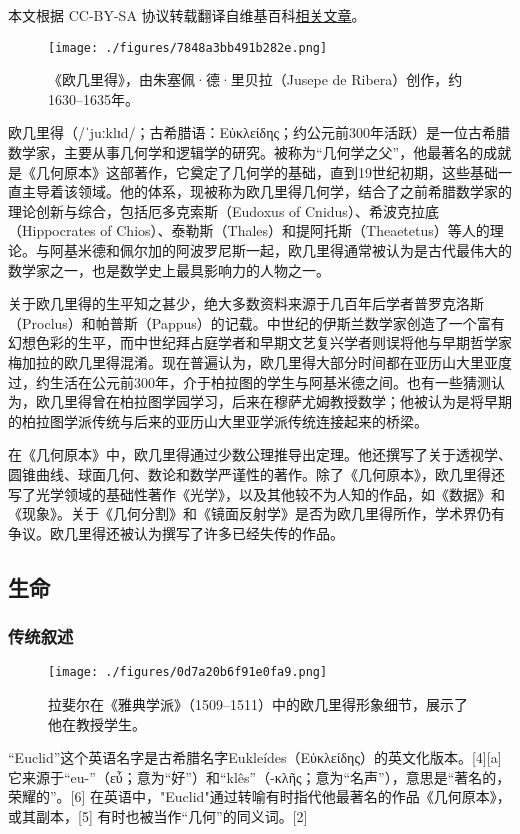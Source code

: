 
本文根据 CC-BY-SA 协议转载翻译自维基百科\href{https://en.wikipedia.org/wiki/Euclid}{相关文章}。

\begin{figure}[ht]
\centering
\texttt{[image: ./figures/7848a3bb491b282e.png]}
\caption{《欧几里得》，由朱塞佩·德·里贝拉（Jusepe de Ribera）创作，约1630–1635年。} \label{fig_Euclid_1}
\end{figure}
欧几里得（/ˈjuːklɪd/；古希腊语：Εὐκλείδης；约公元前300年活跃）是一位古希腊数学家，主要从事几何学和逻辑学的研究。被称为“几何学之父”，他最著名的成就是《几何原本》这部著作，它奠定了几何学的基础，直到19世纪初期，这些基础一直主导着该领域。他的体系，现被称为欧几里得几何学，结合了之前希腊数学家的理论创新与综合，包括厄多克索斯（Eudoxus of Cnidus）、希波克拉底（Hippocrates of Chios）、泰勒斯（Thales）和提阿托斯（Theaetetus）等人的理论。与阿基米德和佩尔加的阿波罗尼斯一起，欧几里得通常被认为是古代最伟大的数学家之一，也是数学史上最具影响力的人物之一。

关于欧几里得的生平知之甚少，绝大多数资料来源于几百年后学者普罗克洛斯（Proclus）和帕普斯（Pappus）的记载。中世纪的伊斯兰数学家创造了一个富有幻想色彩的生平，而中世纪拜占庭学者和早期文艺复兴学者则误将他与早期哲学家梅加拉的欧几里得混淆。现在普遍认为，欧几里得大部分时间都在亚历山大里亚度过，约生活在公元前300年，介于柏拉图的学生与阿基米德之间。也有一些猜测认为，欧几里得曾在柏拉图学园学习，后来在穆萨尤姆教授数学；他被认为是将早期的柏拉图学派传统与后来的亚历山大里亚学派传统连接起来的桥梁。

在《几何原本》中，欧几里得通过少数公理推导出定理。他还撰写了关于透视学、圆锥曲线、球面几何、数论和数学严谨性的著作。除了《几何原本》，欧几里得还写了光学领域的基础性著作《光学》，以及其他较不为人知的作品，如《数据》和《现象》。关于《几何分割》和《镜面反射学》是否为欧几里得所作，学术界仍有争议。欧几里得还被认为撰写了许多已经失传的作品。
\subsection{生命}  
\subsubsection{传统叙述}
\begin{figure}[ht]
\centering
\texttt{[image: ./figures/0d7a20b6f91e0fa9.png]}
\caption{拉斐尔在《雅典学派》（1509–1511）中的欧几里得形象细节，展示了他在教授学生。} \label{fig_Euclid_2}
\end{figure}
“Euclid”这个英语名字是古希腊名字Eukleídes（Εὐκλείδης）的英文化版本。[4][a] 它来源于“eu-”（εὖ；意为“好”）和“klês”（-κλῆς；意为“名声”），意思是“著名的，荣耀的”。[6] 在英语中，"Euclid"通过转喻有时指代他最著名的作品《几何原本》，或其副本，[5] 有时也被当作“几何”的同义词。[2]


